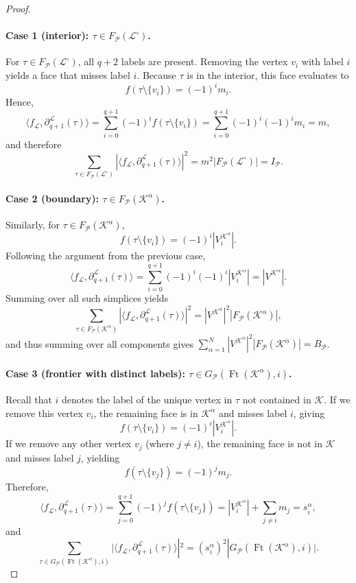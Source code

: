 \documentclass{article}
\newcommand{\KK}{\mathcal{K}}
\newcommand{\LL}{\mathcal{L}}
\newcommand{\Ft}{\operatorname{Ft}}
\begin{document}
\begin{proof}
\paragraph{Case 1 (interior): $\tau \in F_{\mathcal{P}}(\LL^\circ)$.}
For $\tau \in F_{\mathcal{P}}(\LL^\circ)$, all $q+2$ labels are present. Removing the vertex $v_i$ with label $i$ yields a face that misses label $i$. Because $\tau$ is in the interior, this face evaluates to
\[
f(\tau\setminus \{v_i\})=(-1)^im_{i}. 
\]
Hence, 
\[
\langle f_\LL, \partial_{q+1}^\LL(\tau)\rangle = \sum_{i=0}^{q+1}(-1)^i f(\tau\setminus \{v_i\}) = \sum_{i=0}^{q+1}(-1)^i(-1)^i m_i = m,
\]
and therefore
\[
\sum_{\tau\in F_{\mathcal{P}}(\LL^\circ)}|\langle f_\LL, \partial_{q+1}^\LL(\tau)\rangle|^2=
m^2 |F_{\mathcal{P}}(\LL^\circ)| = I_\mathcal{P}.
\]

\paragraph{Case 2 (boundary): $\tau \in F_{\mathcal{P}}(\KK^\alpha)$.}
Similarly, for $\tau \in F_{\mathcal{P}}(\KK^\alpha)$, 
\[
f(\tau\setminus \{v_i\})=(-1)^i|V^{\KK^\alpha}_{i}|. 
\]
Following the argument from the previous case, 
\[
\langle f_\LL, \partial_{q+1}^\LL(\tau)\rangle = \sum_{i=0}^{q+1} (-1)^i(-1)^i|V^{\KK^\alpha}_{i}| = |V^{\KK^\alpha}|.
\]
Summing over all such simplices yields
\[
\sum_{\tau\in F_{\mathcal{P}}(\KK^\alpha)}|\langle f_\LL, \partial_{q+1}^\LL(\tau)\rangle|^2 = |V^{\KK^\alpha}|^2 |F_{\mathcal{P}}(\KK^\alpha)|,
\]
and thus summing over all components gives $\sum_{\alpha=1}^N |V^{\KK^\alpha}|^2 |F_{\mathcal{P}}(\KK^\alpha)| = B_\mathcal{P}$.

\paragraph{Case 3 (frontier with distinct labels): $\tau\in G_{\mathcal{P}}(\Ft(\KK^\alpha), i)$.}
Recall that $i$ denotes the label of the unique vertex in $\tau$ not contained in $\KK$. If we remove this vertex $v_i$, the remaining face is in $\KK^\alpha$ and misses label $i$, giving
\[f(\tau\setminus \{v_i\}) = (-1)^i|V_i^{\KK^\alpha}|.\]
If we remove any other vertex $v_j$ (where $j\neq i$), the remaining face is not in $\KK$ and misses label $j$, yielding
\[f(\tau\setminus \{v_j\}) = (-1)^j m_j.\]
Therefore,
\[\langle f_\LL, \partial_{q+1}^\LL(\tau)\rangle =
\sum_{j=0}^{q+1}(-1)^j f(\tau\setminus \{v_j\})=
|V^{\KK^\alpha}_i| + \sum_{j\neq i}m_j
= s_i^\alpha,
\]
and 
\[
\sum_{\tau\in G_{\mathcal{P}}(\Ft(\KK^\alpha), i)}\big|\langle f_\LL, \partial_{q+1}^\LL(\tau)\rangle|^2=
(s_i^\alpha)^2 |G_{\mathcal{P}}(\Ft(\KK^\alpha), i)|.
\]


\end{proof}
\end{document}
